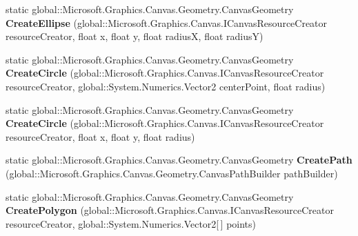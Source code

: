 \begin{DoxyCompactItemize}
static global\+::\+Microsoft.\+Graphics.\+Canvas.\+Geometry.\+Canvas\+Geometry {\bfseries Create\+Ellipse} (global\+::\+Microsoft.\+Graphics.\+Canvas.\+I\+Canvas\+Resource\+Creator resource\+Creator, float x, float y, float radiusX, float radiusY)
\item 
\mbox{\label{class_microsoft_1_1_graphics_1_1_canvas_1_1_geometry_1_1_canvas_geometry_a098a43184492d859176fd9ccac7a99b9}} 
static global\+::\+Microsoft.\+Graphics.\+Canvas.\+Geometry.\+Canvas\+Geometry {\bfseries Create\+Circle} (global\+::\+Microsoft.\+Graphics.\+Canvas.\+I\+Canvas\+Resource\+Creator resource\+Creator, global\+::\+System.\+Numerics.\+Vector2 center\+Point, float radius)
\item 
\mbox{\label{class_microsoft_1_1_graphics_1_1_canvas_1_1_geometry_1_1_canvas_geometry_aa92a58291260e1f96f156e7d47e03c3d}} 
static global\+::\+Microsoft.\+Graphics.\+Canvas.\+Geometry.\+Canvas\+Geometry {\bfseries Create\+Circle} (global\+::\+Microsoft.\+Graphics.\+Canvas.\+I\+Canvas\+Resource\+Creator resource\+Creator, float x, float y, float radius)
\item 
\mbox{\label{class_microsoft_1_1_graphics_1_1_canvas_1_1_geometry_1_1_canvas_geometry_a7a89ba595e7afee0fe55e1dd7c7c4315}} 
static global\+::\+Microsoft.\+Graphics.\+Canvas.\+Geometry.\+Canvas\+Geometry {\bfseries Create\+Path} (global\+::\+Microsoft.\+Graphics.\+Canvas.\+Geometry.\+Canvas\+Path\+Builder path\+Builder)
\item 
\mbox{\label{class_microsoft_1_1_graphics_1_1_canvas_1_1_geometry_1_1_canvas_geometry_a1f5119d034d404cb9dc30ac067fcc1d1}} 
static global\+::\+Microsoft.\+Graphics.\+Canvas.\+Geometry.\+Canvas\+Geometry {\bfseries Create\+Polygon} (global\+::\+Microsoft.\+Graphics.\+Canvas.\+I\+Canvas\+Resource\+Creator resource\+Creator, global\+::\+System.\+Numerics.\+Vector2\mbox{[}$\,$\mbox{]} points)
\item 
\mbox{\label{class_microsoft_1_1_graphics_1_1_canvas_1_1_geometry_1_1_canvas_geometry_a9905813ee5fbbed32289fa93a3ecaed8}} 

\end{DoxyCompactItemize}
